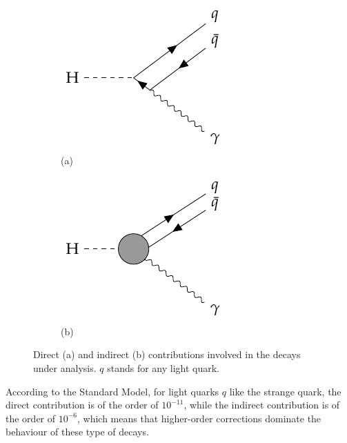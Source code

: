 \begin{figure}[!ht]
    \captionsetup[subfigure]{labelformat=empty}
    \vspace*{-0.2cm}
    \centering
    \setlength{\mylength}{\textwidth}
    \begin{subfigure}[t]{0.5\mylength}
            \centering
            \includegraphics[height=0.26\mylength]{resources/H_rare_decays_vertices/v1.pdf}
            \setlength{\unitlength}{0.26\mylength}
            \caption{\footnotesize (a)}
    \end{subfigure}%
    \begin{subfigure}[t]{0.5\mylength}
            \centering
            \includegraphics[height=0.26\mylength]{resources/H_rare_decays_vertices/v2_2.pdf}
            \setlength{\unitlength}{0.26\mylength}
            \caption{\footnotesize (b)}
    \end{subfigure}%
    \vspace*{-0.0cm}
    \caption{Direct (a) and indirect (b) contributions involved in the decays under analysis. $q$ stands for any light quark.}
    \label{fig:Higgs_rare_decay_veritces}
    \vspace*{-0.0cm}
\end{figure}

According to the Standard Model, for light quarks $q$ like the strange quark, the direct contribution is of the order of $10^{-11}$, while the indirect contribution is of the order of $10^{-6}$, which means that higher-order corrections dominate the behaviour of these type of decays.

